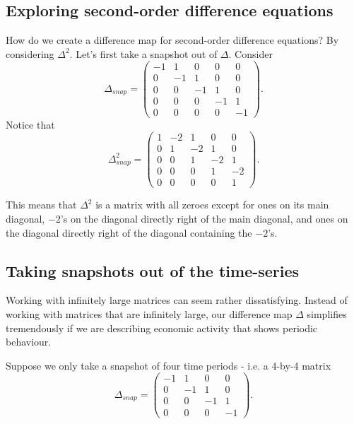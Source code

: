 \documentclass[a4paper, 12pt,oneside,openany]{book}
\begin{document}
\subsection{Exploring second-order difference equations}
 
 
How do we create a difference map for second-order difference equations? By considering $\Delta^2.$ Let's first take a snapshot out of $\Delta$. Consider $$\Delta_{snap} = \begin{pmatrix}-1&1&0&0&0 \\0&-1&1&0&0 \\ 0&0&-1&1&0 \\ 0&0&0&-1&1 \\ 0&0&0&0&-1 \end{pmatrix}. $$ Notice that $$\Delta_{snap}^2 =  \begin{pmatrix}1&-2&1&0&0 \\0&1&-2&1&0 \\ 0&0&1&-2&1 \\ 0&0&0&1&-2 \\ 0&0&0&0&1 \end{pmatrix}.$$

This means that $\Delta^2$ is a matrix with all zeroes except for ones on its main diagonal, $-2$'s on the diagonal directly right of the main diagonal, and ones on the diagonal directly right of the diagonal containing the $-2$'s. 
 
\subsection{Taking snapshots out of the time-series}

Working with infinitely large matrices can seem rather dissatisfying. Instead of working with matrices that are infinitely large, our difference map $\Delta$ simplifies tremendously if we are describing economic activity that shows periodic behaviour. 

Suppose we only take a snapshot of four time periods - i.e. a 4-by-4 matrix $$\Delta_{snap} = \begin{pmatrix} -1&1&0&0 \\ 0&-1&1&0 \\ 0&0&-1&1 \\ 0&0&0&-1 \end{pmatrix}.$$ 
\end{document}
